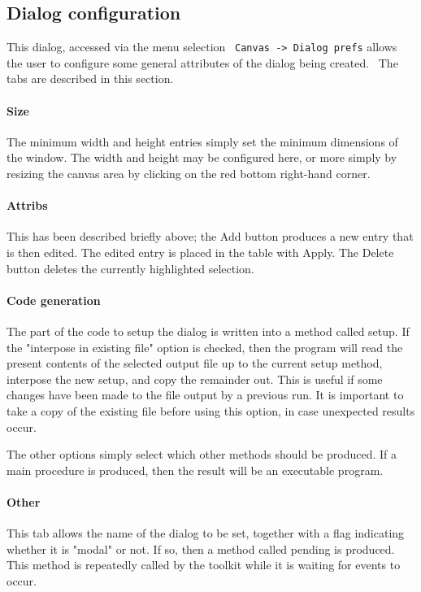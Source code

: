 \subsection*{Dialog configuration}

This dialog, accessed via the menu selection \ \texttt{Canvas
-{\textgreater} Dialog prefs} allows the user to configure some general
attributes of the dialog being created. \ The tabs are described in
this section.

\paragraph{Size}
The minimum width and height entries simply set the minimum dimensions
of the window. The width and height may be configured here, or more
simply by resizing the canvas area by clicking on the red bottom
right-hand corner.

\paragraph{Attribs}
This has been described briefly above; the Add button produces a new
entry that is then edited. The edited entry is placed in the table with
Apply. The Delete button deletes the currently highlighted selection.

\paragraph{Code generation}
The part of the code to setup the dialog is written into a method called
setup. If the "interpose in existing file"
option is checked, then the program will read the present contents of
the selected output file up to the current setup method, interpose the
new setup, and copy the remainder out. This is useful if some changes
have been made to the file output by a previous run. It is
important to take a copy of the existing file before using this option,
in case unexpected results occur.

The other options simply select which other methods should be produced.
If a main procedure is produced, then the result will be an executable
program.

\paragraph{Other}
This tab allows the name of the dialog to be set, together with a flag
indicating whether it is "modal" or not. If
so, then a method called pending is produced. This method is repeatedly
called by the toolkit while it is waiting for events to occur.


